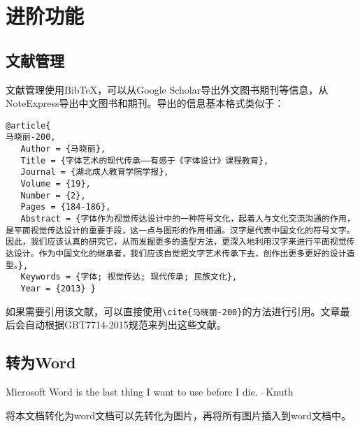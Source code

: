 \section{进阶功能}
\subsection{文献管理}
文献管理使用Bib\TeX ，可以从Google Scholar导出外文图书期刊等信息，从NoteExpress导出中文图书和期刊\cite{刘运来-199}。导出的信息基本格式类似于：
\begin{verbatim}
@article{
马晓丽-200,
   Author = {马晓丽},
   Title = {字体艺术的现代传承——有感于《字体设计》课程教育},
   Journal = {湖北成人教育学院学报},
   Volume = {19},
   Number = {2},
   Pages = {184-186},
   Abstract = {字体作为视觉传达设计中的一种符号文化，起着人与文化交流沟通的作用，是平面视觉传达设计的重要手段，这一点与图形的作用相通。汉字是代表中国文化的符号文字。因此，我们应该认真的研究它，从而发掘更多的造型方法，更深入地利用汉字来进行平面视觉传达设计。作为中国文化的继承者，我们应该自觉把文字艺术传承下去，创作出更多更好的设计造型。},
   Keywords = {字体; 视觉传达; 现代传承; 民族文化},
   Year = {2013} }
\end{verbatim}
如果需要引用该文献，可以直接使用\verb|\cite{马晓丽-200}|的方法进行引用。文章最后会自动根据GBT7714-2015规范来列出这些文献。
\subsection{转为Word}
Microsoft Word is the last thing I want to use before I die.
--Knuth

将本文档转化为word文档可以先转化为图片，再将所有图片插入到word文档中。